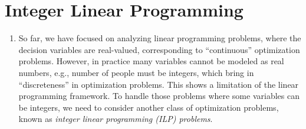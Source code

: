 \section{Integer Linear Programming}
\label{sect:ilp}
\begin{enumerate}
\item So far, we have focused on analyzing linear programming problems, where
the decision variables are real-valued, corresponding to ``continuous''
optimization problems. However, in practice many variables cannot be modeled as
real numbers, e.g., number of people must be integers, which bring in
``discreteness'' in optimization problems. This shows a limitation of the
linear programming framework. To handle those problems where some
variables can be integers, we need to consider another class of optimization
problems, known as \emph{integer linear programming (ILP) problems}.
\end{enumerate}
